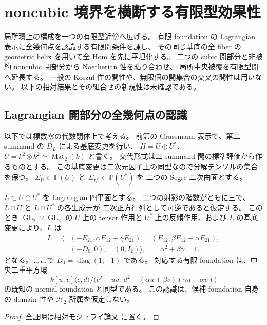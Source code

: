 \section{noncubic 境界を横断する有限型効果性}
\label{sec:noncubic-finite-type}

局所環上の構成を一つの有限型近傍へ広げる。
有限 foundation の Lagrangian 表示に全幾何点を認識する有限開条件を課し、
その同じ基底の全 fiber の geometric helix を用いて全 Hom を先に平坦化する。
二つの cubic 開部分と非被約 noncubic 閉部分から Noetherian 性を貼り合わせ、
局所中央被覆を有限型開へ延長する。
一般の Koszul 性の開性や、無限個の開集合の交叉の開性は用いない。
以下の相対結果とその組合せの新規性は未確認である。

\subsection{Lagrangian 開部分の全幾何点の認識}

以下では標数零の代数閉体上で考える。
前節の Grassmann 表示で、第二 summand の $D_L$ による基底変更を行い、
$H=U\oplus U^*$、$U=k^2\otimes k^2\simeq\operatorname{Mat}_2(k)$ と書く。
交代形式は二 summand 間の標準評価から作るものとする。
この基底変更は二次元因子上の同型なので分解テンソルの集合を保つ。
$\Sigma_U\subset\mathbb P(U)$ と $\Sigma_{U^*}\subset\mathbb P(U^*)$ を
二つの Segre 二次曲面とする。

\begin{lemma}
\label{lem:lagrangian-double-rank-three-recognition}
$L\subset U\oplus U^*$ を Lagrangian 四平面とする。
二つの射影の階数がともに三で、$L\cap U$ と $L\cap U^*$ の各生成元が
二次正方行列として可逆であると仮定する。
このとき $\operatorname{GL}_2\times\operatorname{GL}_2$ の $U$ 上の tensor 作用と
$U^*$ 上の反傾作用、および $L$ の基底変更により、$L$ は
\begin{equation}\label{eq:lagrangian-rank-three-normal-form}
\begin{aligned}
 L=\bigl\langle&(-E_{21},\alpha E_{12}+\gamma E_{21}),\quad
 (E_{12},\beta E_{12}-\alpha E_{21}),\\
 &(-D_0,0),\quad (0,I_2)\bigr\rangle,
 \qquad \alpha^2+\beta\gamma=1.
\end{aligned}
\end{equation}
となる。ここで $D_0=\operatorname{diag}(1,-1)$ である。
対応する有限 foundation は、中央二重平方環
\[
 k[u,v]\langle c,d\rangle/
 \bigl(c^2-uv,\ d^2-(\alpha u+\beta v)(\gamma u-\alpha v)\bigr)
\]
の既知の normal foundation と同型である。
この認識は、候補 foundation 自身の domain 性や $\mathcal H_2$ 所属を仮定しない。
\end{lemma}
\begin{proof}
全証明は相対モジュライ論文 \cite[noncubic有限型効果性]{QuadricModuli2026} に置く。
\end{proof}

